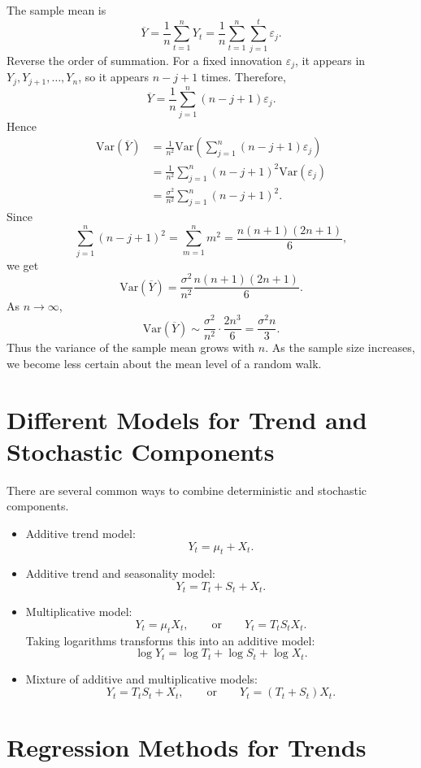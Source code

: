 \documentclass[12pt,oneside]{book}
\numberwithin{equation}{section}
\theoremstyle{definition}
\theoremstyle{plain}
\theoremstyle{remark}
\newcommand{\Var}{\mathrm{Var}}
\begin{document}
The sample mean is
\[
\overline{Y}
=
\frac{1}{n}\sum_{t=1}^nY_t
=
\frac{1}{n}\sum_{t=1}^n\sum_{j=1}^t\varepsilon_j.
\]
Reverse the order of summation. For a fixed innovation $\varepsilon_j$, it appears in $Y_j,Y_{j+1},\ldots,Y_n$, so it appears $n-j+1$ times. Therefore,
\[
\overline{Y}
=
\frac{1}{n}\sum_{j=1}^n(n-j+1)\varepsilon_j.
\]
Hence
\begin{align*}
\Var(\overline{Y})
&=
\frac{1}{n^2}
\Var\left(
\sum_{j=1}^n(n-j+1)\varepsilon_j
\right) \\
&=
\frac{1}{n^2}
\sum_{j=1}^n(n-j+1)^2\Var(\varepsilon_j) \\
&=
\frac{\sigma^2}{n^2}
\sum_{j=1}^n(n-j+1)^2.
\end{align*}
Since
\[
\sum_{j=1}^n(n-j+1)^2
=
\sum_{m=1}^n m^2
=
\frac{n(n+1)(2n+1)}{6},
\]
we get
\[
\Var(\overline{Y})
=
\frac{\sigma^2}{n^2}
\frac{n(n+1)(2n+1)}{6}.
\]
As $n\to\infty$,
\[
\Var(\overline{Y})
\sim
\frac{\sigma^2}{n^2}\cdot \frac{2n^3}{6}
=
\frac{\sigma^2 n}{3}.
\]
Thus the variance of the sample mean grows with $n$. As the sample size increases, we become less certain about the mean level of a random walk.

\section{Different Models for Trend and Stochastic Components}

There are several common ways to combine deterministic and stochastic components.

\begin{itemize}
\item Additive trend model:
\[
Y_t=\mu_t+X_t.
\]

\item Additive trend and seasonality model:
\[
Y_t=T_t+S_t+X_t.
\]

\item Multiplicative model:
\[
Y_t=\mu_tX_t,
\qquad
\text{or}
\qquad
Y_t=T_tS_tX_t.
\]
Taking logarithms transforms this into an additive model:
\[
\log Y_t=\log T_t+\log S_t+\log X_t.
\]

\item Mixture of additive and multiplicative models:
\[
Y_t=T_tS_t+X_t,
\qquad
\text{or}
\qquad
Y_t=(T_t+S_t)X_t.
\]
\end{itemize}

\section{Regression Methods for Trends}
\end{document}
